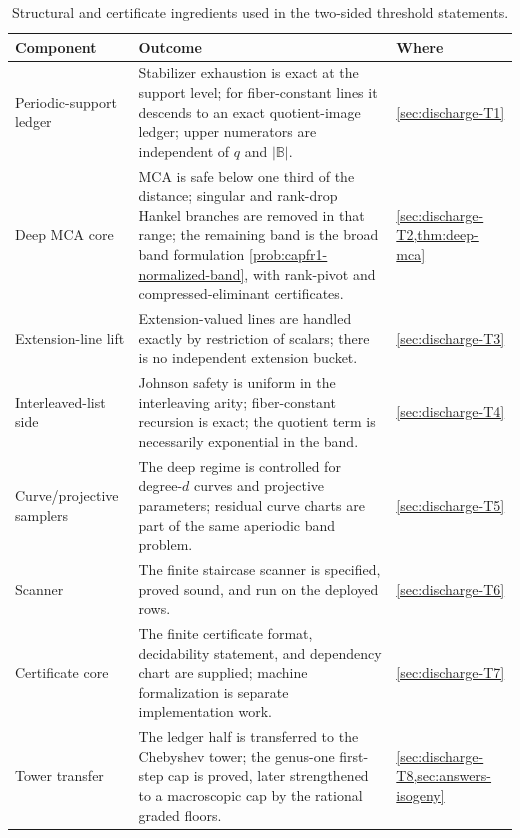 \documentclass[11pt]{article}
\theoremstyle{definition}
\theoremstyle{remark}
\newcommand{\B}{\mathbb{B}}
\begin{document}
\begin{table}[ht]
\centering
\small
\begin{tabular}{@{}p{2.7cm}p{7.9cm}l@{}}
\toprule
Component & Outcome & Where \\
\midrule
Periodic-support ledger & Stabilizer exhaustion is exact at the support level; for fiber-constant lines it descends to an exact quotient-image ledger; upper numerators are independent of $q$ and $|\B|$. & \cref{sec:discharge-T1} \\
Deep MCA core & MCA is safe below one third of the distance; singular and rank-drop Hankel branches are removed in that range; the remaining band is the broad band formulation \cref{prob:capfr1-normalized-band}, with rank-pivot and compressed-eliminant certificates. & \cref{sec:discharge-T2,thm:deep-mca} \\
Extension-line lift & Extension-valued lines are handled exactly by restriction of scalars; there is no independent extension bucket. & \cref{sec:discharge-T3} \\
Interleaved-list side & Johnson safety is uniform in the interleaving arity; fiber-constant recursion is exact; the quotient term is necessarily exponential in the band. & \cref{sec:discharge-T4} \\
Curve/projective samplers & The deep regime is controlled for degree-$d$ curves and projective parameters; residual curve charts are part of the same aperiodic band problem. & \cref{sec:discharge-T5} \\
Scanner & The finite staircase scanner is specified, proved sound, and run on the deployed rows. & \cref{sec:discharge-T6} \\
Certificate core & The finite certificate format, decidability statement, and dependency chart are supplied; machine formalization is separate implementation work. & \cref{sec:discharge-T7} \\
Tower transfer & The ledger half is transferred to the Chebyshev tower; the genus-one first-step cap is proved, later strengthened to a macroscopic cap by the rational graded floors. & \cref{sec:discharge-T8,sec:answers-isogeny} \\
\bottomrule
\end{tabular}
\caption{Structural and certificate ingredients used in the two-sided threshold statements.}
\label{tab:status}
\end{table}
\end{document}
